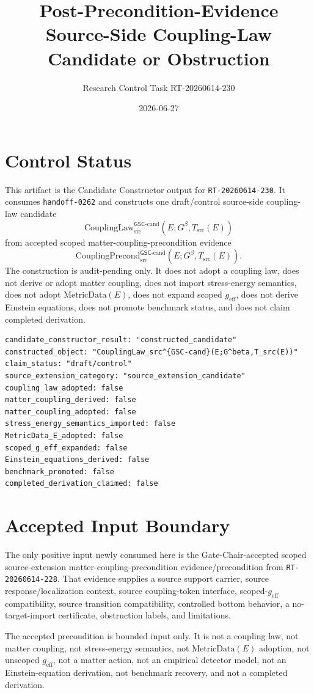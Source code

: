 \documentclass[11pt]{article}
\title{Post-Precondition-Evidence Source-Side Coupling-Law Candidate or Obstruction}
\author{Research Control Task RT-20260614-230}
\date{2026-06-27}
\newcommand{\Gbeta}{G^\beta}
\newcommand{\geff}{g_{\mathrm{eff}}}
\newcommand{\CouplingPrecond}{\mathrm{CouplingPrecond}^{\mathsf{GSC}\mbox{-}\mathrm{cand}}_{\mathrm{src}}}
\newcommand{\CouplingLaw}{\mathrm{CouplingLaw}^{\mathsf{GSC}\mbox{-}\mathrm{cand}}_{\mathrm{src}}}
\newcommand{\MetricData}{\mathrm{MetricData}}
\begin{document}
\maketitle

\section{Control Status}

This artifact is the Candidate Constructor output for
\texttt{RT-20260614-230}. It consumes \texttt{handoff-0262} and constructs one
draft/control source-side coupling-law candidate
\[
  \CouplingLaw(E;\Gbeta,T_{\mathrm{src}}(E))
\]
from accepted scoped matter-coupling-precondition evidence
\[
  \CouplingPrecond(E;\Gbeta,T_{\mathrm{src}}(E)).
\]
The construction is audit-pending only. It does not adopt a coupling law, does
not derive or adopt matter coupling, does not import stress-energy semantics,
does not adopt \(\MetricData(E)\), does not expand scoped \(\geff\), does not
derive Einstein equations, does not promote benchmark status, and does not
claim completed derivation.

\begin{verbatim}
candidate_constructor_result: "constructed_candidate"
constructed_object: "CouplingLaw_src^{GSC-cand}(E;G^beta,T_src(E))"
claim_status: "draft/control"
source_extension_category: "source_extension_candidate"
coupling_law_adopted: false
matter_coupling_derived: false
matter_coupling_adopted: false
stress_energy_semantics_imported: false
MetricData_E_adopted: false
scoped_g_eff_expanded: false
Einstein_equations_derived: false
benchmark_promoted: false
completed_derivation_claimed: false
\end{verbatim}

\section{Accepted Input Boundary}

The only positive input newly consumed here is the Gate-Chair-accepted scoped
source-extension matter-coupling-precondition evidence/precondition from
\texttt{RT-20260614-228}. That evidence supplies a source support carrier,
source response/localization context, source coupling-token interface,
scoped-\(\geff\) compatibility, source transition compatibility, controlled
bottom behavior, a no-target-import certificate, obstruction labels, and
limitations.

The accepted precondition is bounded input only. It is not a coupling law, not
matter coupling, not stress-energy semantics, not \(\MetricData(E)\) adoption,
not unscoped \(\geff\), not a matter action, not an empirical detector model,
not an Einstein-equation derivation, not benchmark recovery, and not a
completed derivation.
\end{document}
